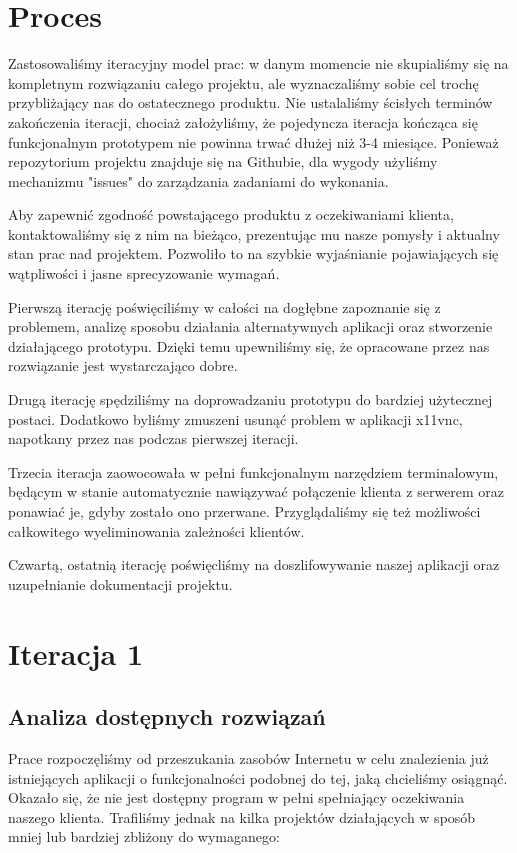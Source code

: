 \section{Proces}

Zastosowaliśmy iteracyjny model prac: w danym momencie nie skupialiśmy się na kompletnym rozwiązaniu całego projektu, ale wyznaczaliśmy sobie cel trochę przybliżający nas do ostatecznego produktu. Nie ustalaliśmy ścisłych terminów zakończenia iteracji, chociaż założyliśmy, że pojedyncza iteracja kończąca się funkcjonalnym prototypem nie powinna trwać dłużej niż 3-4 miesiące. Ponieważ repozytorium projektu znajduje się na Githubie, dla wygody użyliśmy mechanizmu "issues" do zarządzania zadaniami do wykonania.

Aby zapewnić zgodność powstającego produktu z oczekiwaniami klienta, kontaktowaliśmy się z nim na bieżąco, prezentując mu nasze pomysły i aktualny stan prac nad projektem. Pozwoliło to na szybkie wyjaśnianie pojawiających się wątpliwości i jasne sprecyzowanie wymagań.

Pierwszą iterację poświęciliśmy w całości na dogłębne zapoznanie się z problemem, analizę sposobu działania alternatywnych aplikacji oraz stworzenie działającego prototypu. Dzięki temu upewniliśmy się, że opracowane przez nas rozwiązanie jest wystarczająco dobre.

Drugą iterację spędziliśmy na doprowadzaniu prototypu do bardziej użytecznej postaci. Dodatkowo byliśmy zmuszeni usunąć problem w aplikacji x11vnc, napotkany przez nas podczas pierwszej iteracji.

Trzecia iteracja zaowocowała w pełni funkcjonalnym narzędziem terminalowym, będącym w stanie automatycznie nawiązywać połączenie klienta z serwerem oraz ponawiać je, gdyby zostało ono przerwane. Przyglądaliśmy się też możliwości całkowitego wyeliminowania zależności klientów.

Czwartą, ostatnią iterację poświęcliśmy na doszlifowywanie naszej aplikacji oraz uzupełnianie dokumentacji projektu.

\section{Iteracja 1}
  \subsection{Analiza dostępnych rozwiązań}
    Prace rozpoczęliśmy od przeszukania zasobów Internetu w celu znalezienia już istniejących aplikacji o funkcjonalności podobnej do tej, jaką chcieliśmy osiągnąć. Okazało się, że nie jest dostępny program w pełni spełniający oczekiwania naszego klienta. Trafiliśmy jednak na kilka projektów działających w sposób mniej lub bardziej zbliżony do wymaganego:

